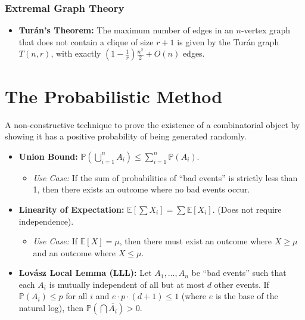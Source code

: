 \documentclass[11pt]{article}
\begin{document}
\section{Extremal Graph Theory}
\begin{itemize}
    \item \textbf{Turán's Theorem:} The maximum number of edges in an \(n\)-vertex graph that does not contain a clique of size \(r+1\) is given by the Turán graph \(T(n,r)\), with exactly \(\left(1 - \frac{1}{r}\right)\frac{n^2}{2} + O(n)\) edges.
\end{itemize}

\hrulefill

\part{The Probabilistic Method}

A non-constructive technique to prove the existence of a combinatorial object by showing it has a positive probability of being generated randomly.

\begin{itemize}
    \item \textbf{Union Bound:} \(\mathbb{P}(\bigcup_{i=1}^n A_i) \le \sum_{i=1}^n \mathbb{P}(A_i)\). 
    \begin{itemize}
        \item \emph{Use Case:} If the sum of probabilities of ``bad events'' is strictly less than 1, then there exists an outcome where no bad events occur.
    \end{itemize}
    \item \textbf{Linearity of Expectation:} \(\mathbb{E}[\sum X_i] = \sum \mathbb{E}[X_i]\). (Does not require independence).
    \begin{itemize}
        \item \emph{Use Case:} If \(\mathbb{E}[X] = \mu\), then there must exist an outcome where \(X \ge \mu\) and an outcome where \(X \le \mu\).
    \end{itemize}
    \item \textbf{Lovász Local Lemma (LLL):} Let \(A_1, \dots, A_n\) be ``bad events'' such that each \(A_i\) is mutually independent of all but at most \(d\) other events. If \(\mathbb{P}(A_i) \le p\) for all \(i\) and \(e \cdot p \cdot (d+1) \le 1\) (where \(e\) is the base of the natural log), then \(\mathbb{P}(\bigcap \overline{A_i}) > 0\).
\end{itemize}

\hrulefill
\end{document}
